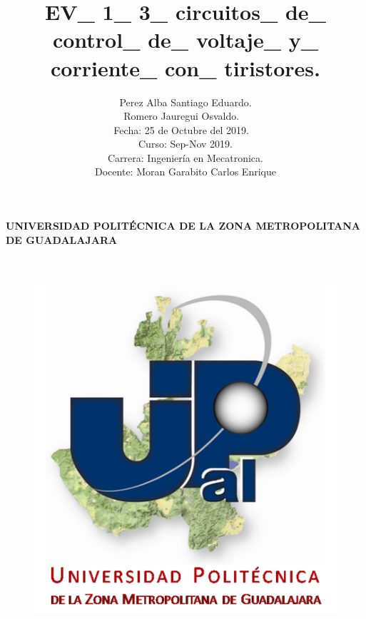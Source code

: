 \documentclass[12pt,letterpaper]{article}
\title{EV\_ 1\_ 3\_ circuitos\_ de\_ control\_ de\_ voltaje\_ y\_ corriente\_ con\_ tiristores.}
\begin{document}
\maketitle




\paragraph{ UNIVERSIDAD POLITÉCNICA DE LA ZONA METROPOLITANA DE GUADALAJARA}

\
\begin{figure}[h!]
\begin{center}

\includegraphics[scale=0.8]{Upzmg.png} 
\label{Upzmg}


\end{center}
\end{figure}


\

\author{Perez Alba Santiago Eduardo. \\ Romero Jauregui Osvaldo.
\

Fecha: 25 de Octubre del 2019.
\

Curso: Sep-Nov 2019.

\
Carrera: Ingeniería en Mecatronica.\

Docente: Moran Garabito Carlos Enrique}
\end{document}
